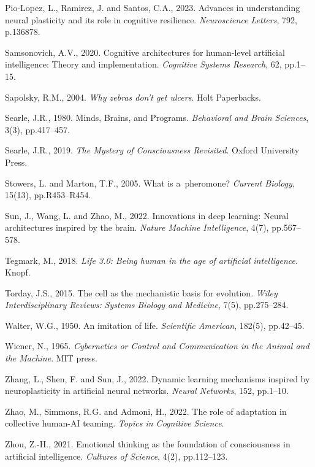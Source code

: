 Pio-Lopez, L., Ramirez, J. and Santos, C.A., 2023. Advances in understanding neural plasticity and its role in cognitive resilience. \textit{Neuroscience Letters}, 792, p.136878.



Samsonovich, A.V., 2020. Cognitive architectures for human-level artificial intelligence: Theory and implementation. \textit{Cognitive Systems Research}, 62, pp.1–15.



Sapolsky, R.M., 2004. \textit{Why zebras don't get ulcers}. Holt Paperbacks.



Searle, J.R., 1980. Minds, Brains, and Programs. \textit{Behavioral and Brain Sciences}, 3(3), pp.417–457.



Searle, J.R., 2019. \textit{The Mystery of Consciousness Revisited}. Oxford University Press.



Stowers, L. and Marton, T.F., 2005. What is a~pheromone? \textit{Current Biology}, 15(13), pp.R453–R454.



Sun, J., Wang, L. and Zhao, M., 2022. Innovations in deep learning: Neural architectures inspired by the brain. \textit{Nature Machine Intelligence}, 4(7), pp.567–578.



Tegmark, M., 2018. \textit{Life 3.0: Being human in the age of artificial intelligence}. Knopf.



Torday, J.S., 2015. The cell as the mechanistic basis for evolution. \textit{Wiley Interdisciplinary Reviews: Systems Biology and Medicine}, 7(5), pp.275–284.



Walter, W.G., 1950. An imitation of life. \textit{Scientific American}, 182(5), pp.42–45.



Wiener, N., 1965. \textit{Cybernetics or Control and Communication in the Animal and the Machine}. MIT press.



Zhang, L., Shen, F. and Sun, J., 2022. Dynamic learning mechanisms inspired by neuroplasticity in artificial neural networks. \textit{Neural Networks}, 152, pp.1–10.



Zhao, M., Simmons, R.G. and Admoni, H., 2022. The role of adaptation in collective human-AI teaming. \textit{Topics in Cognitive Science}.



Zhou, Z.-H., 2021. Emotional thinking as the foundation of consciousness in artificial intelligence. \textit{Cultures of Science}, 4(2), pp.112–123.




